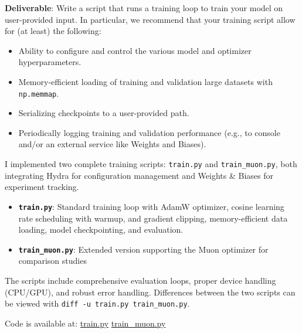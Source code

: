
\textbf{Deliverable}: Write a script that runs a training loop to train your model on user-provided input. In particular, we recommend that your training script allow for (at least) the following:

\begin{itemize}
    \item Ability to configure and control the various model and optimizer hyperparameters.
    \item Memory-efficient loading of training and validation large datasets with \lstinline{np.memmap}.
    \item Serializing checkpoints to a user-provided path.
    \item Periodically logging training and validation performance (e.g., to console and/or an external service like Weights and Biases).
\end{itemize}

\begin{answer}
I implemented two complete training scripts: \lstinline{train.py} and \lstinline{train_muon.py}, both integrating Hydra for configuration management and Weights \& Biases for experiment tracking.

\begin{itemize}
    \item \textbf{\lstinline{train.py}}: Standard training loop with AdamW optimizer, cosine learning rate scheduling with warmup, and gradient clipping, memory-efficient data loading, model checkpointing, and evaluation.
    \item \textbf{\lstinline{train_muon.py}}: Extended version supporting the Muon optimizer for comparison studies
\end{itemize}

The scripts include comprehensive evaluation loops, proper device handling (CPU/GPU), and robust error handling. Differences between the two scripts can be viewed with \lstinline{diff -u train.py train_muon.py}.

Code is available at:
\href{https://github.com/donglinkang2021/assignment1-basics/blob/main/train.py}{train.py} 
\href{https://github.com/donglinkang2021/assignment1-basics/blob/main/train_muon.py}{train\_muon.py}

\end{answer}
